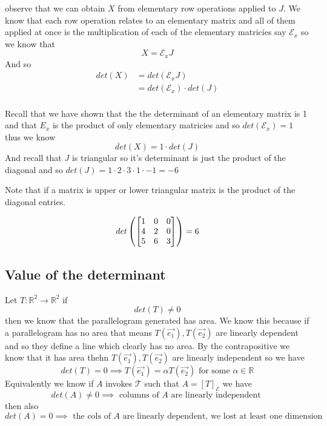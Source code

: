 \documentclass[11pt]{book}
\begin{document}
observe that we can obtain $X$ from elementary row operations applied to $J$. We know that each row operation relates to an elementary matrix and all of them applied at once is the multiplication of each of the elementary matricies say $\mathcal{E} _{x} $ so we know that
\[
X= \mathcal{E} _{x} J
\]
And so 
\begin{align*}
    \mathit{det} \left(X\right) &= \mathit{det} \left(\mathcal{E} _{x} J\right)   \\ 
    &= \mathit{det} \left(\mathcal{E} _{x} \right)  \cdot \mathit{det} \left(J\right)   \\ 
\end{align*}

Recall that we have shown that the the determinant of an elementary matrix is 1 and that $E_{x} $ is the product of only elementary matricies and so $\mathit{det} \left(\mathcal{E }_{x}  \right) = 1$ thus we know 
\[
\mathit{det} \left(X\right) = 1  \cdot \mathit{det} \left(J\right) 
\]
And recall that $J$ is triangular so it's determinant is just the product of the diagonal and so $\mathit{det} \left(J\right) = 1 \cdot 2 \cdot 3 \cdot 1  \cdot -1 = -6$  

Note that if a matrix is upper or lower triangular matrix is the product of the diagonal entries.
\begin{eg}
    \[
    \mathit{det} \left(\mat[b]{ 1 & 0 & 0 \\ 4 & 2 & 0 \\ 5 & 6 & 3 }\right) = 6
    \]
\end{eg}


\subsection{Value of the determinant}%
\label{sub:value_of_the_determinant}

Let $T : \mathbb{R} ^2  \to \mathbb{R} ^2  $ if 
\[
\mathit{det} \left(T\right) \neq 0
\]
then we know that the parallelogram generated has area. We know this because if a parallelogram has no area that means $T\left(\vec{e_1} \right) , T\left(\vec{e_2} \right) $ are linearly dependent and so they define a line which clearly has no area. By the contrapositive we know that it has area thehn $T\left(\vec{e_1} \right) , T\left(\vec{e_2} \right) $ are linearly independent so we have
\[
\mathit{det} \left(T\right) = 0 \implies T\left(\vec{e_1} \right) = \alpha T\left(\vec{e_2} \right) \text{ for some  } \alpha \in \mathbb{R} 
\]
Equivalently we know if $A$ invokes $\mathcal{T} $ such that $A= \left[ T \right]_{\mathcal{E}} $ we have 
\[
\mathit{det} \left(A\right) \neq 0 \implies \text{ columns of $A$ are linearly independent  } 
\]
then also
\[
    \mathit{det} \left(A\right) = 0 \implies \text{ the cols of $A$ are linearly dependent, we lost at least one dimension  } 
\]
\end{document}
